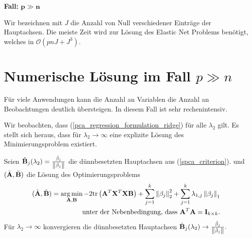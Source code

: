 \textbf{Fall: } $\mathbf{p \gg n}$

Wir bezeichnen mit $J$ die Anzahl von Null verschiedener Einträge der Hauptachsen. Die meiste Zeit wird zur Lösung des Elastic Net Problems benötigt, welches in $\mathcal{O}(pnJ + J^3)$.


\section{Numerische Lösung im Fall $p \gg n$}
\label{numerical_solution_p_greater_n}

Für viele Anwendungen kann die Anzahl an Variablen die Anzahl an Beobachtungen deutlich übersteigen. In diesem Fall ist sehr rechenintensiv.

Wir beobachten, dass (\ref{pca_regression_formulation_ridge}) für alle $\lambda_2$ gilt. Es stellt sich heraus, dass für $\lambda_2 \to \infty$ eine explizite Lösung des Minimierungsproblem existiert.
\begin{thm} \label{spca_p_greater_n}
Seien $\hat{\mathbf{B}}_j(\lambda_2) = \frac{\hat{\beta}_j}{\left\lVert \hat{\beta}_j \right\rVert}$ die dünnbesetzten Hauptachsen aus (\ref{spca_criterion}).
und $(\tilde{\mathbf{A}}, \tilde{\mathbf{B}})$ die Lösung des Optimierungsproblems
\begin{align}
\label{spca_p_greater_n_problem}
\begin{split}
(\tilde{\mathbf{A}}, \tilde{\mathbf{B}}) = \operatorname*{arg\,min}_{\mathbf{A}, \mathbf{B}} -2\text{tr} \left( \mathbf{A}^T\mathbf{X}^T\mathbf{X} \mathbf{B} \right) + \sum_{j=1}^k \left\lVert \beta_j \right\rVert_2^2 + \sum_{j=1}^k \lambda_{1,j}\left\lVert \beta_j \right\rVert_1\\
\text{unter der Nebenbedingung, dass } \mathbf{A}^T \mathbf{A} = \mathbf{I}_{k \times k}.
\end{split}
\end{align}
Für $\lambda_2 \to \infty$ konvergieren die dünnbesetzten Hauptachsen $\hat{\mathbf{B}}_j(\lambda_2) \to \frac{\tilde{\beta}_j}{\left\lVert \tilde{\beta}_j \right\rVert}.$
\end{thm}

